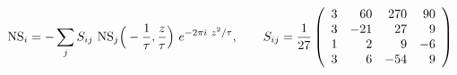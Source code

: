 \begin{equation}\label{S_ij}
  {\rm NS}_i = -\sum_j S_{ij}~{\rm NS}_j
\Big(-{1\over\tau},{z\over\tau}\Big) ~e^{-2\pi i~z^2/\tau}, \qquad
S_{ij} = {1\over 27} \left( 
\begin{array}{rrrr}
3 & 60 & 270 & 90 \\
3 & -21 & 27 & 9 \\
1 & 2 & 9 & -6 \\
3 & 6 & -54 & 9
\end{array} 
 \right)
\end{equation}

